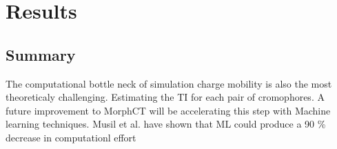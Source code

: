 \chapter{Results}
\label{chap:results}

\section{Summary}

\indent The computational bottle neck of simulation charge mobility is also the most theoreticaly challenging.
Estimating the TI for each pair of cromophores. A future improvement to MorphCT will be accelerating this step
with Machine learning techniques. Musil et al. have shown that ML could produce a 90 \% decrease in
computationl effort \cite{Musil2018}

